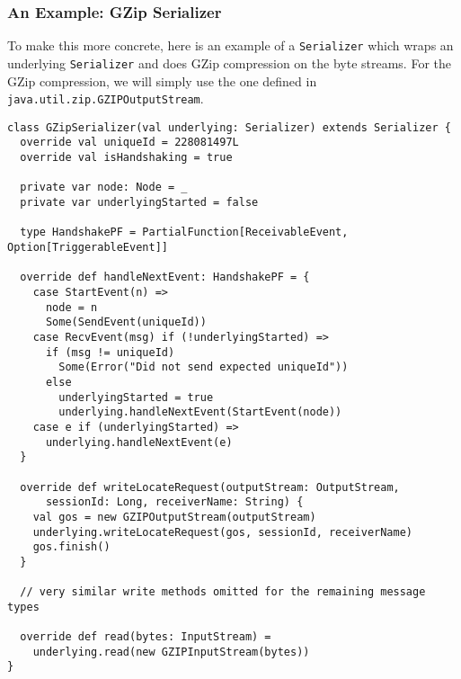 \documentclass{article}
\begin{document}
\subsubsection{An Example: GZip Serializer}
To make this more concrete, here is an example of a \verb|Serializer| which wraps an underlying
\verb|Serializer| and does GZip compression on the byte streams. For the GZip compression,
we will simply use the one defined in \verb|java.util.zip.GZIPOutputStream|.
\begin{verbatim}
class GZipSerializer(val underlying: Serializer) extends Serializer {
  override val uniqueId = 228081497L
  override val isHandshaking = true

  private var node: Node = _
  private var underlyingStarted = false

  type HandshakePF = PartialFunction[ReceivableEvent, Option[TriggerableEvent]]

  override def handleNextEvent: HandshakePF = {
    case StartEvent(n) =>
      node = n
      Some(SendEvent(uniqueId))
    case RecvEvent(msg) if (!underlyingStarted) =>
      if (msg != uniqueId)
        Some(Error("Did not send expected uniqueId"))
      else
        underlyingStarted = true
        underlying.handleNextEvent(StartEvent(node))
    case e if (underlyingStarted) =>
      underlying.handleNextEvent(e)
  }

  override def writeLocateRequest(outputStream: OutputStream, 
      sessionId: Long, receiverName: String) {
    val gos = new GZIPOutputStream(outputStream)
    underlying.writeLocateRequest(gos, sessionId, receiverName)
    gos.finish()
  }

  // very similar write methods omitted for the remaining message types

  override def read(bytes: InputStream) =
    underlying.read(new GZIPInputStream(bytes))
}
\end{verbatim}
\end{document}
